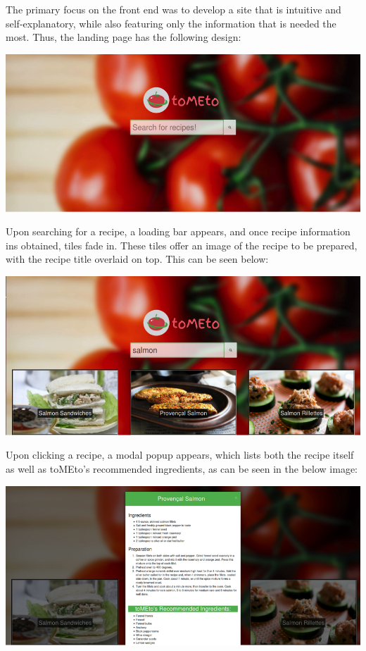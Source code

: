 \documentclass{acm_proc_article-sp}
\begin{document}
The primary focus on the front end was to develop a site that is intuitive and self-explanatory, while also featuring only the information that is needed the most. Thus, the landing page has the following design:

\includegraphics[scale=0.5]{p1.png}

Upon searching for a recipe, a loading bar appears, and once recipe information ins obtained, tiles fade in. These tiles offer an image of the recipe to be prepared, with the recipe title overlaid on top. This can be seen below:

\includegraphics[scale=0.5]{p2.png}

Upon clicking a recipe, a modal popup appears, which lists both the recipe itself as well as toMEto’s recommended ingredients, as can be seen in the below image:

\includegraphics[scale=0.5]{p3.png}
\end{document}
